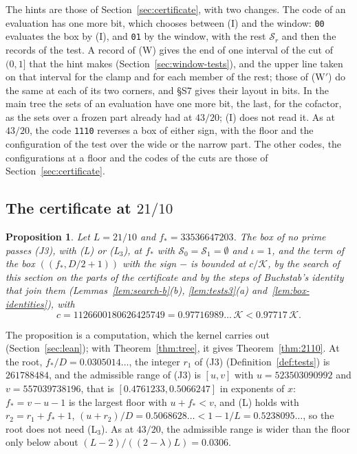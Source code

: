 \documentclass[11pt]{article}
\newtheorem{proposition}[theorem]{Proposition}
\theoremstyle{definition}
\begin{document}
The hints are those of Section~\ref{sec:certificate}, with two changes. The code of an evaluation has one more bit,
which chooses between (I) and the window: \texttt{00} evaluates the box by (I), and \texttt{01} by the window, with
the rest $\mathcal S_r$ and then the records of the test. A record of (W) gives the end of one interval of the cut of
$(0, 1]$ that the hint makes (Section~\ref{sec:window-tests}), and the upper line taken on that interval for the clamp
and for each member of the rest; those of (W$'$) do the same at each of its two corners, and \S S7 gives their layout
in bits. In the main tree the sets of an evaluation have one more bit, the last, for the cofactor, as the sets over a
frozen part already had at $43/20$; (I) does not read it. As at $43/20$, the code \texttt{1110} reverses a box of
either sign, with the floor and the configuration of the test over the wide or the narrow part. The other codes, the
configurations at a floor and the codes of the cuts are those of Section~\ref{sec:certificate}.

\subsection{The certificate at \texorpdfstring{$21/10$}{21/10}}

\begin{proposition}\label{prop:certificate-b}
Let $L = 21/10$ and $f_* = 33536647203$. The box of no prime passes (J3), with (L) or (L$_3$), at $f_*$ with $\mathcal
S_0 = \mathcal S_1 = \emptyset$ and $\iota = 1$, and the term of the box $((f_*, D/2 + 1))$ with the sign $-$ is bounded
at $c/\mathcal K$, by the search of this section on the parts of the certificate and by the steps of Buchstab's
identity that join them
(Lemmas~\ref{lem:search-b}(b), \ref{lem:tests3}(a) and~\ref{lem:box-identities}), with
\[
  c = 1126600180626425749 = 0.97716989\ldots\, \mathcal K < 0.97717\, \mathcal K.
\]
\end{proposition}

The proposition is a computation, which the kernel carries out (Section~\ref{sec:lean}); with
Theorem~\ref{thm:tree}, it gives Theorem~\ref{thm:2110}. At the root, $f_*/D =
0.0305014\ldots$, the integer $r_1$ of (J3) (Definition~\ref{def:tests}) is $261788484$, and the admissible range of
(J3) is $[u, v]$ with $u = 523503090992$ and $v = 557039738196$, that is
$[0.4761233, 0.5066247]$ in exponents of $x$: $f_* = v - u - 1$ is the largest floor with $u + f_* < v$, and (L) holds
with $r_2 = r_1 + f_* + 1$, $(u + r_2)/D = 0.5068628\ldots < 1 - 1/L = 0.5238095\ldots$, so the root does not need
(L$_3$). As at $43/20$, the
admissible range is wider than the floor only below about $(L - 2)/((2 - \lambda)L) = 0.0306$.
\end{document}
